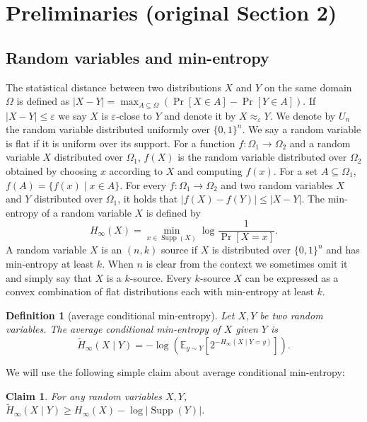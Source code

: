 \documentclass[10pt,a4paper]{article}
\newtheorem{definition}[theorem]{Definition}
\newtheorem{claim}[theorem]{Claim}
\DeclareMathOperator{\Supp}{Supp}
\newcommand{\E}{\mathbb E}
\newcommand{\HH}{\widetilde H_\infty}
\begin{document}
\section*{Preliminaries (original Section 2)}
\subsection*{Random variables and min-entropy}
The statistical distance between two distributions $X$ and $Y$ on the same domain $\Omega$ is defined as $|X-Y|=\max_{A\subseteq\Omega}(\Pr[X\in A]-\Pr[Y\in A])$. If $|X-Y|\le\varepsilon$ we say $X$ is $\varepsilon$-close to $Y$ and denote it by $X\approx_\varepsilon Y$. We denote by $U_n$ the random variable distributed uniformly over $\{0,1\}^n$. We say a random variable is flat if it is uniform over its support.
For a function $f:\Omega_1\to\Omega_2$ and a random variable $X$ distributed over $\Omega_1$, $f(X)$ is the random variable distributed over $\Omega_2$ obtained by choosing $x$ according to $X$ and computing $f(x)$. For a set $A\subseteq\Omega_1$, $f(A)=\{f(x)\mid x\in A\}$. For every $f:\Omega_1\to\Omega_2$ and two random variables $X$ and $Y$ distributed over $\Omega_1$, it holds that $|f(X)-f(Y)|\le|X-Y|$.
The min-entropy of a random variable $X$ is defined by
\[H_\infty(X)=\min_{x\in\Supp(X)}\log\frac1{\Pr[X=x]}.\]
A random variable $X$ is an $(n,k)$ source if $X$ is distributed over $\{0,1\}^n$ and has min-entropy at least $k$. When $n$ is clear from the context we sometimes omit it and simply say that $X$ is a $k$-source. Every $k$-source $X$ can be expressed as a convex combination of flat distributions each with min-entropy at least $k$.
\setcounter{theorem}{5}
\begin{definition}[average conditional min-entropy]
Let $X,Y$ be two random variables. The average conditional min-entropy of $X$ given $Y$ is
\[\HH(X\mid Y)=-\log\left(\E_{y\sim Y}\left[2^{-H_\infty(X\mid Y=y)}\right]\right).\]
\end{definition}
We will use the following simple claim about average conditional min-entropy:
\begin{claim}For any random variables $X,Y$, $\HH(X\mid Y)\ge H_\infty(X)-\log|\Supp(Y)|$.\end{claim}
\end{document}
